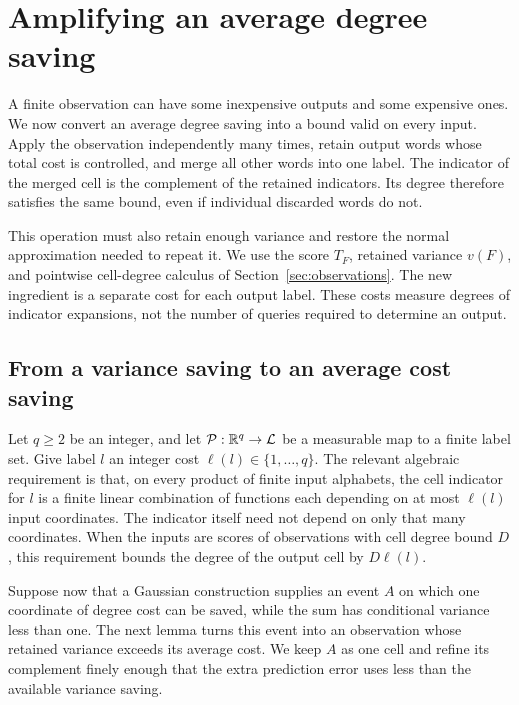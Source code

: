 \section{Amplifying an average degree saving}\label{sec:mean-cost}

A finite observation can have some inexpensive outputs and some expensive
ones. We now convert an average degree saving into a bound valid on every
input. Apply the observation independently many times, retain output
words whose total cost is controlled, and merge all other words into one
label. The indicator of the merged cell is the complement of the retained
indicators. Its degree therefore satisfies the same bound, even if
individual discarded words do not.

This operation must also retain enough variance and restore the normal
approximation needed to repeat it. We use the score $T_F$, retained
variance $v(F)$, and pointwise cell-degree calculus of
Section~\ref{sec:observations}. The new ingredient is a separate cost for
each output label. These costs measure degrees of indicator expansions,
not the number of queries required to determine an output.

\subsection{From a variance saving to an average cost saving}
\label{sec:refinement-first}


Let $q\ge2$ be an integer, and let
$\mathcal P:\mathbb R^q\to\mathcal L$ be a measurable map to a finite label
set.  Give label $l$ an integer cost $\ell(l)\in\{1,\ldots,q\}$.
The relevant algebraic requirement is that, on every product of finite
input alphabets, the cell indicator for $l$ is a finite linear
combination of functions each depending on at most $\ell(l)$ input
coordinates.  The indicator itself need not depend on only that many
coordinates.  When the inputs are scores of observations with cell
degree bound $D$, this requirement bounds the degree of the output
cell by $D\ell(l)$.


Suppose now that a Gaussian construction supplies an event $A$ on which
one coordinate of degree cost can be saved, while the sum has conditional
variance less than one. The next lemma turns this event into an
observation whose retained variance exceeds its average cost. We keep
$A$ as one cell and refine its complement finely enough that the extra
prediction error uses less than the available variance saving.

